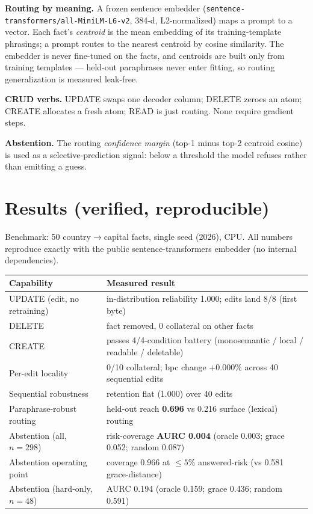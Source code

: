 \documentclass[11pt]{article}
\begin{document}
\textbf{Routing by meaning.} A frozen sentence embedder
(\texttt{sentence-transformers/all-MiniLM-L6-v2}, 384-d, L2-normalized) maps a prompt to a vector.
Each fact's \emph{centroid} is the mean embedding of its training-template phrasings; a prompt routes
to the nearest centroid by cosine similarity. The embedder is never fine-tuned on the facts, and
centroids are built only from training templates --- held-out paraphrases never enter fitting, so
routing generalization is measured leak-free.

\textbf{CRUD verbs.} UPDATE swaps one decoder column; DELETE zeroes an atom; CREATE allocates a fresh
atom; READ is just routing. None require gradient steps.

\textbf{Abstention.} The routing \emph{confidence margin} (top-1 minus top-2 centroid cosine) is used
as a selective-prediction signal: below a threshold the model refuses rather than emitting a guess.

\section{Results (verified, reproducible)}
Benchmark: 50 country$\rightarrow$capital facts, single seed (2026), CPU. All numbers reproduce exactly
with the public sentence-transformers embedder (no internal dependencies).

\begin{center}
\begin{tabular}{L{6.2cm} L{8.0cm}}
\hline
\textbf{Capability} & \textbf{Measured result} \\
\hline
UPDATE (edit, no retraining) & in-distribution reliability 1.000; edits land 8/8 (first byte) \\
DELETE & fact removed, 0 collateral on other facts \\
CREATE & passes 4/4-condition battery (monosemantic / local / readable / deletable) \\
Per-edit locality & 0/10 collateral; bpc change $+0.000\%$ across 40 sequential edits \\
Sequential robustness & retention flat (1.000) over 40 edits \\
Paraphrase-robust routing & held-out reach \textbf{0.696} vs 0.216 surface (lexical) routing \\
Abstention (all, $n{=}298$) & risk-coverage \textbf{AURC 0.004} (oracle 0.003; grace 0.052; random 0.087) \\
Abstention operating point & coverage 0.966 at $\le 5\%$ answered-risk (vs 0.581 grace-distance) \\
Abstention (hard-only, $n{=}48$) & AURC 0.194 (oracle 0.159; grace 0.436; random 0.591) \\
\hline
\end{tabular}
\end{center}
\end{document}
